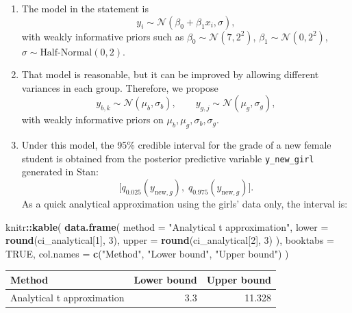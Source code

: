 \documentclass[
  12pt,
]{article}
\newenvironment{Shaded}{\begin{snugshade}}{\end{snugshade}}
\newcommand{\AttributeTok}[1]{\textcolor[rgb]{0.13,0.29,0.53}{#1}}
\newcommand{\ConstantTok}[1]{\textcolor[rgb]{0.56,0.35,0.01}{#1}}
\newcommand{\DecValTok}[1]{\textcolor[rgb]{0.00,0.00,0.81}{#1}}
\newcommand{\FunctionTok}[1]{\textcolor[rgb]{0.13,0.29,0.53}{\textbf{#1}}}
\newcommand{\NormalTok}[1]{#1}
\newcommand{\SpecialCharTok}[1]{\textcolor[rgb]{0.81,0.36,0.00}{\textbf{#1}}}
\newcommand{\StringTok}[1]{\textcolor[rgb]{0.31,0.60,0.02}{#1}}
\begin{document}
\begin{enumerate}
\def\labelenumi{\arabic{enumi}.}
\item
  The model in the statement is \[
  y_i \sim \mathcal N(\beta_0 + \beta_1 x_i, \sigma),
  \] with weakly informative priors such as
  \(\beta_0 \sim \mathcal N(7,2^2)\),
  \(\beta_1 \sim \mathcal N(0,2^2)\),
  \(\sigma \sim \text{Half-Normal}(0,2)\).
\item
  That model is reasonable, but it can be improved by allowing different
  variances in each group. Therefore, we propose \[
  y_{b,k} \sim \mathcal N(\mu_b, \sigma_b), \qquad
  y_{g,j} \sim \mathcal N(\mu_g, \sigma_g),
  \] with weakly informative priors on
  \(\mu_b, \mu_g, \sigma_b, \sigma_g\).
\item
  Under this model, the 95\% credible interval for the grade of a new
  female student is obtained from the posterior predictive variable
  \texttt{y\_new\_girl} generated in Stan: \[
  \bigl[q_{0.025}(y_{\text{new},g}),\; q_{0.975}(y_{\text{new},g})\bigr].
  \] As a quick analytical approximation using the girls' data only, the
  interval is:
\end{enumerate}

\begin{Shaded}
\begin{Highlighting}[]
\NormalTok{knitr}\SpecialCharTok{::}\FunctionTok{kable}\NormalTok{(}
  \FunctionTok{data.frame}\NormalTok{(}
    \AttributeTok{method =} \StringTok{"Analytical t approximation"}\NormalTok{,}
    \AttributeTok{lower =} \FunctionTok{round}\NormalTok{(ci\_analytical[}\DecValTok{1}\NormalTok{], }\DecValTok{3}\NormalTok{),}
    \AttributeTok{upper =} \FunctionTok{round}\NormalTok{(ci\_analytical[}\DecValTok{2}\NormalTok{], }\DecValTok{3}\NormalTok{)}
\NormalTok{  ),}
  \AttributeTok{booktabs =} \ConstantTok{TRUE}\NormalTok{,}
  \AttributeTok{col.names =} \FunctionTok{c}\NormalTok{(}\StringTok{"Method"}\NormalTok{, }\StringTok{"Lower bound"}\NormalTok{, }\StringTok{"Upper bound"}\NormalTok{)}
\NormalTok{)}
\end{Highlighting}
\end{Shaded}

\begin{longtable}[]{@{}lrr@{}}
\toprule\noalign{}
Method & Lower bound & Upper bound \\
\midrule\noalign{}
\endhead
\bottomrule\noalign{}
\endlastfoot
Analytical t approximation & 3.3 & 11.328 \\
\end{longtable}
\end{document}
